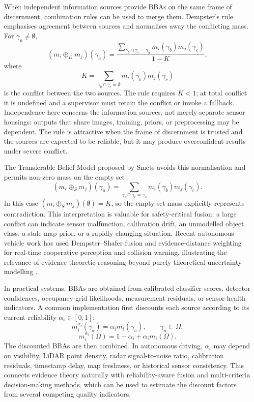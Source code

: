 When independent information sources provide BBAs on the same frame of discernment, combination rules can be used to merge them. Dempster's rule emphasises agreement between sources and normalises away the conflicting mass. For \(\gamma_a\neq\emptyset\),
\begin{equation}
(m_i\oplus_D m_j)(\gamma_a)=
\frac{\displaystyle\sum_{\gamma_b \cap \gamma_c=\gamma_a} m_i(\gamma_b)m_j(\gamma_c)}
{1-K},
\label{eq:dempster}
\end{equation}
where
\begin{equation}
K=\sum_{\gamma_b \cap \gamma_c=\emptyset}m_i(\gamma_b)m_j(\gamma_c)
\end{equation}
is the conflict between the two sources. The rule requires $K<1$; at total conflict it is undefined and a supervisor must retain the conflict or invoke a fallback. Independence here concerns the information sources, not merely separate sensor housings: outputs that share images, training, priors, or preprocessing may be dependent. The rule is attractive when the frame of discernment is trusted and the sources are expected to be reliable, but it may produce overconfident results under severe conflict.

The Transferable Belief Model proposed by Smets avoids this normalisation and permits non-zero mass on the empty set \cite{smets_transferable_1990}:
\begin{equation}
(m_i\oplus_S m_j)(\gamma_a)=
\sum_{\gamma_b \cap \gamma_c=\gamma_a}m_i(\gamma_b)m_j(\gamma_c).
\label{eq:smets}
\end{equation}
In this case \((m_i\oplus_S m_j)(\emptyset)=K\), so the empty-set mass explicitly represents contradiction. This interpretation is valuable for safety-critical fusion: a large conflict can indicate sensor malfunction, calibration drift, an unmodelled object class, a stale map prior, or a rapidly changing situation. Recent autonomous-vehicle work has used Dempster--Shafer fusion and evidence-distance weighting for real-time cooperative perception and collision warning, illustrating the relevance of evidence-theoretic reasoning beyond purely theoretical uncertainty modelling \cite{cho_realtime_2020}.

In practical systems, BBAs are obtained from calibrated classifier scores, detector confidences, occupancy-grid likelihoods, measurement residuals, or sensor-health indicators. A common implementation first discounts each source according to its current reliability \(\alpha_i\in[0,1]\):
\begin{equation}
m_i^{\alpha_i}(\gamma_a)=\alpha_i m_i(\gamma_a),
\qquad \gamma_a \subset \Omega,
\end{equation}
\begin{equation}
m_i^{\alpha_i}(\Omega)=1-\alpha_i+\alpha_i m_i(\Omega).
\end{equation}
The discounted BBAs are then combined. In autonomous driving, \(\alpha_i\) may depend on visibility, LiDAR point density, radar signal-to-noise ratio, calibration residuals, timestamp delay, map freshness, or historical sensor consistency. This connects evidence theory naturally with reliability-aware fusion and multi-criteria decision-making methods, which can be used to estimate the discount factors from several competing quality indicators.

